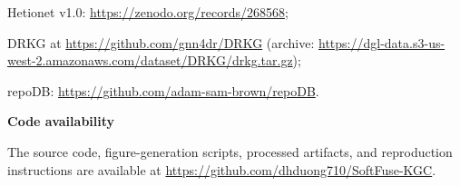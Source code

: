 \documentclass[pdflatex,sn-mathphys-num]{sn-jnl}
\begin{document}
Hetionet v1.0: \url{https://zenodo.org/records/268568}; 

DRKG at \url{https://github.com/gnn4dr/DRKG} (archive: \url{https://dgl-data.s3-us-west-2.amazonaws.com/dataset/DRKG/drkg.tar.gz});

repoDB: \url{https://github.com/adam-sam-brown/repoDB}.\par\smallskip

\noindent\textbf{Code availability}\par
\noindent The source code, figure-generation scripts, processed artifacts, and reproduction instructions are available at \url{https://github.com/dhduong710/SoftFuse-KGC}.


\end{document}
